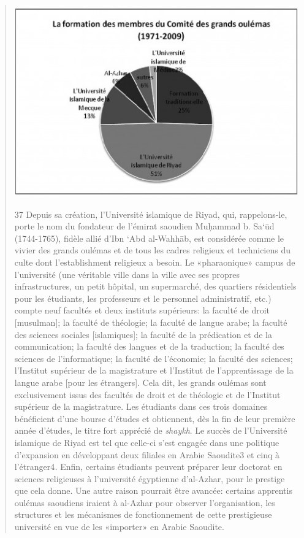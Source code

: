 \begin{quote}
\begin{marginfigure}
\includegraphics[width=1.2\textwidth]{CourantsIslamContemporain/ImagesCourantsIslamContemporain/image14.jpeg}
\end{marginfigure}

37 Depuis sa création, l'Université islamique de Riyad, qui,
rappelons-le, porte le nom du fondateur de l'émirat saoudien Muḥammad b.
Sa`ūd (1744-1765), fidèle allié d'Ibn `Abd al-Wahhāb, est considérée
comme le vivier des grands oulémas et de tous les cadres religieux et
techniciens du culte dont l'establishment religieux a besoin. Le
«pharaonique» campus de l'université (une véritable ville dans la ville
avec ses propres infrastructures, un petit hôpital, un supermarché, des
quartiers résidentiels pour les étudiants, les professeurs et le
personnel administratif, etc.) compte neuf facultés et deux instituts
supérieurs: la faculté de droit {[}musulman{]}; la faculté de théologie;
la faculté de langue arabe; la faculté des sciences sociales
{[}islamiques{]}; la faculté de la prédication et de la communication;
la faculté des langues et de la traduction; la faculté des sciences de
l'informatique; la faculté de l'économie; la faculté des sciences;
l'Institut supérieur de la magistrature et l'Institut de l'apprentissage
de la langue arabe {[}pour les étrangers{]}. Cela dit, les grands
oulémas sont exclusivement issus des facultés de droit et de théologie
et de l'Institut supérieur de la magistrature. Les étudiants dans ces
trois domaines bénéficient d'une bourse d'études et obtiennent, dès la
fin de leur première année d'études, le titre fort apprécié de
\emph{shaykh}. Le succès de l'Université islamique de Riyad est tel que
celle-ci s'est engagée dans une politique d'expansion en développant
deux filiales en Arabie Saoudite3 et cinq à l'étranger4\emph{.} Enfin,
certains étudiants peuvent préparer leur doctorat en sciences
religieuses à l'université égyptienne d'al-Azhar, pour le prestige que
cela donne. Une autre raison pourrait être avancée: certains apprentis
oulémas saoudiens iraient à al-Azhar pour observer l'organisation, les
structures et les mécanismes de fonctionnement de cette prestigieuse
université en vue de les
«importer» en Arabie Saoudite.


\end{quote}
